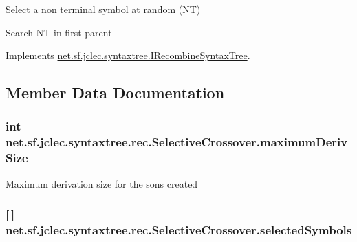\begin{DoxyEnumerate}
\item Select a non terminal symbol at random (N\-T) 
\item Search N\-T in first parent 
\end{DoxyEnumerate}

Implements \hyperlink{interfacenet_1_1sf_1_1jclec_1_1syntaxtree_1_1_i_recombine_syntax_tree_a4187214454e215f9d481f4a26e0584f1}{net.\-sf.\-jclec.\-syntaxtree.\-I\-Recombine\-Syntax\-Tree}.



\subsection{Member Data Documentation}
\hypertarget{classnet_1_1sf_1_1jclec_1_1syntaxtree_1_1rec_1_1_selective_crossover_a75e89888e0faf2a2a7a9ff001f3de7bb}{
\subsubsection[{maximum\-Deriv\-Size}]{\setlength{\rightskip}{0pt plus 5cm}int net.\-sf.\-jclec.\-syntaxtree.\-rec.\-Selective\-Crossover.\-maximum\-Deriv\-Size\hspace{0.3cm}{\ttfamily [protected]}}}\label{classnet_1_1sf_1_1jclec_1_1syntaxtree_1_1rec_1_1_selective_crossover_a75e89888e0faf2a2a7a9ff001f3de7bb}
Maximum derivation size for the sons created \hypertarget{classnet_1_1sf_1_1jclec_1_1syntaxtree_1_1rec_1_1_selective_crossover_a7f8d97cea074c43baa44fc063bd30315}{
\subsubsection[{selected\-Symbols}]{ \mbox{[}$\,$\mbox{]} net.\-sf.\-jclec.\-syntaxtree.\-rec.\-Selective\-Crossover.\-selected\-Symbols\hspace{0.3cm}{\ttfamily [protected]}}}\label{classnet_1_1sf_1_1jclec_1_1syntaxtree_1_1rec_1_1_selective_crossover_a7f8d97cea074c43baa44fc063bd30315}
